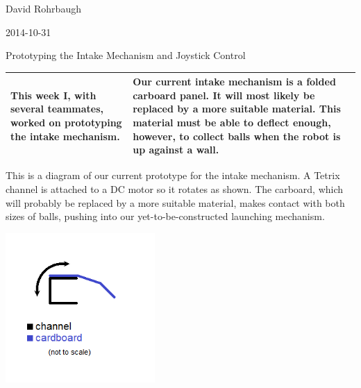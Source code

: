 David Rohrbaugh

2014-10-31

Prototyping the Intake Mechanism and Joystick Control

\begin{tabular}{|p{5cm}|p{5cm}|}
 \hline
 This week I, with several teammates, worked on prototyping the intake mechanism.
 &
 Our current intake mechanism is a folded carboard panel. It will most likely be replaced by a more suitable material. This material must be able to deflect enough, however, to collect balls when the robot is up against a wall.
 \\
 \hline
\end{tabular}

\medskip

This is a diagram of our current prototype for the intake mechanism. A Tetrix channel is attached to a DC motor so it rotates as shown. The carboard, which will probably be replaced by a more suitable material, makes contact with both sizes of balls, pushing into our yet-to-be-constructed launching mechanism.

\begin{center}
 \includegraphics[width=215px]{./Entries/Images/intakePrototype.png}
\end{center}
